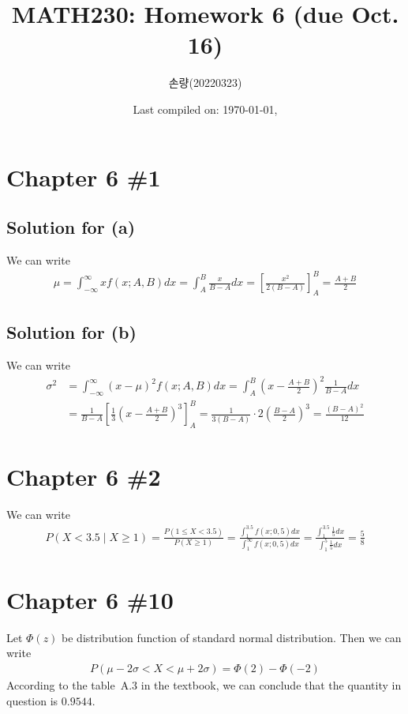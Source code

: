 \documentclass{scrartcl}
\title{MATH230: Homework 6 (due Oct. 16)}
\author{손량(20220323)}
\date{Last compiled on: \today, \currenttime}
\begin{document}
\maketitle

\section{Chapter 6 \#1}
\subsection{Solution for (a)}
We can write
\begin{align*}
  \mu
  = \int^\infty_{-\infty} x f(x; A, B) dx
  = \int^B_A \frac{x}{B - A} dx
  = \left[ \frac{x^2}{2(B - A)} \right]^B_A
  = \frac{A + B}{2}
\end{align*}

\subsection{Solution for (b)}
We can write
\begin{align*}
  \sigma^2
  &= \int^\infty_{-\infty} (x - \mu)^2 f(x; A, B) dx
  = \int^B_A \left( x - \frac{A + B}{2} \right)^2 \frac{1}{B - A} dx \\
  &= \frac{1}{B - A}
    \left[ \frac{1}{3} \left( x - \frac{A + B}{2} \right)^3 \right]^B_A
  = \frac{1}{3(B - A)} \cdot 2 \left( \frac{B - A}{2} \right)^3
  = \frac{(B - A)^2}{12}
\end{align*}

\section{Chapter 6 \#2}
We can write
\begin{align*}
  P(X < 3.5\; |\; X \ge 1)
  = \frac{P(1 \le X < 3.5)}{P(X \ge 1)}
  = \frac{\int^{3.5}_1 f(x; 0, 5) dx}{\int^\infty_1 f(x; 0, 5) dx}
  = \frac{\int^{3.5}_1 \frac{1}{5} dx}{\int^5_1 \frac{1}{5} dx}
  = \frac{5}{8}
\end{align*}

\section{Chapter 6 \#10}
Let \(\Phi(z)\) be distribution function of standard normal distribution. Then
we can write
\begin{align*}
  P(\mu - 2\sigma < X < \mu + 2\sigma)
  = \Phi(2) - \Phi(-2)
\end{align*}
According to the table~A.3 in the textbook, we can conclude that the quantity
in question is \(0.9544\).
\end{document}
